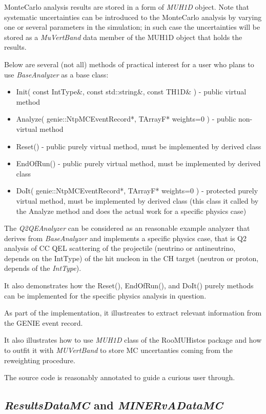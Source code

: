 MonteCarlo analysis results are stored in a form of {\it MUH1D} object. Note that systematic uncertainties can be 
introduced to the MonteCarlo analysis by varying one or several parameters in the simulation; in such case the 
uncertainties will be stored as a {\it MuVertBand} data member of the MUH1D object that holds the results. 

Below are several (not all) methods of practical interest for a user who plans to use {\it BaseAnalyzer }
as a base class:
\begin{itemize}
\item{ Init( const IntType\&, const std::string\&, const TH1D\& ) - public virtual method}
\item{ Analyze( genie::NtpMCEventRecord*, TArrayF* weights=0 ) - public non-virtual method}
\item{ Reset() - public purely virtual method, must be implemented by derived class}
\item{ EndOfRun() - public purely virtual method, must be implemented by derived class}
\item{ DoIt( genie::NtpMCEventRecord*, TArrayF* weights=0 ) - protected purely virtual method, 
       must be implemented by derived class (this class it called by the Analyze method and 
       does the actual work for a specific physics case) }
\end{itemize}
 
The {\it Q2QEAnalyzer} can be considered as an reasonable example analyzer that derives from {\it BaseAnalyzer} 
and implements a specific physics case, that is Q2 analysis of CC QEL scattering of the projectile (neutrino 
or antineutrino, depends on the IntType) of the hit nucleon in the CH target (neutron or proton, depends of 
the {\it IntType}).

It also demonstrates how the Reset(), EndOfRun(), and DoIt() purely methods can be implemented for the specific
physics analysis in question.

As part of the implementation, it illustreates to extract relevant information from the GENIE event record.

It also illustrates how to use {\it MUH1D} class of the RooMUHistos package\cite{roomuhistos} and how to outfit it
with {\it MUVertBand} to store MC uncertanties coming from the reweighting procedure.

The source code is reasonably annotated to guide a curious user through.

\subsection{ {\it ResultsDataMC} and {\it MINERvADataMC} }

